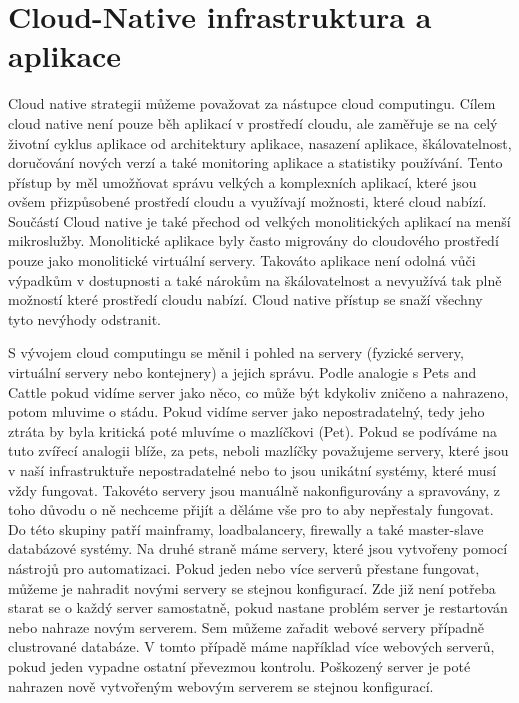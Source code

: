 \chapter{Cloud-Native infrastruktura a aplikace}
Cloud native strategii můžeme považovat za nástupce cloud computingu. Cílem cloud native není pouze běh aplikací v prostředí cloudu, ale zaměřuje se na celý životní cyklus aplikace od architektury aplikace, nasazení aplikace, škálovatelnost, doručování nových verzí a také monitoring aplikace a statistiky používání. Tento přístup by měl umožňovat správu velkých a komplexních aplikací, které jsou ovšem přizpůsobené prostředí cloudu a využívají možnosti, které cloud nabízí. Součástí Cloud native je také přechod od velkých monolitických aplikací na menší mikroslužby. Monolitické aplikace byly často migrovány do cloudového prostředí pouze jako monolitické virtuální servery. Takováto aplikace není odolná vůči výpadkům v dostupnosti a  také nárokům na škálovatelnost \cite{BRUNNER} a nevyužívá tak plně možností které prostředí cloudu nabízí. Cloud native přístup se snaží všechny tyto nevýhody odstranit. \par
    S vývojem cloud computingu se měnil i pohled na servery (fyzické servery, virtuální servery nebo kontejnery) a jejich správu. Podle analogie s Pets and Cattle \cite{petsvscattle} pokud vidíme server jako něco, co může být kdykoliv zničeno a nahrazeno, potom mluvime o stádu. Pokud vidíme server jako nepostradatelný, tedy jeho ztráta by byla kritická poté mluvíme o mazlíčkovi (Pet). Pokud se podíváme na tuto zvířecí analogii blíže, za pets, neboli mazlíčky považujeme servery, které jsou v naší infrastruktuře nepostradatelné nebo to jsou unikátní systémy, které musí vždy fungovat. Takovéto servery jsou manuálně nakonfigurovány a spravovány, z toho důvodu o ně nechceme přijít a děláme vše pro to aby nepřestaly fungovat. Do této skupiny patří mainframy, loadbalancery, firewally a také master-slave databázové systémy.  Na druhé straně máme servery, které jsou vytvořeny pomocí nástrojů pro automatizaci. Pokud jeden nebo více serverů přestane fungovat, můžeme je nahradit novými servery se stejnou konfigurací. Zde již není potřeba starat se o každý server samostatně, pokud nastane problém server je restartován nebo nahraze novým serverem. Sem můžeme zařadit webové servery případně clustrované databáze. V tomto případě máme například více webových serverů, pokud jeden vypadne ostatní převezmou kontrolu. Poškozený server je poté nahrazen nově vytvořeným webovým serverem se stejnou konfigurací. \par
